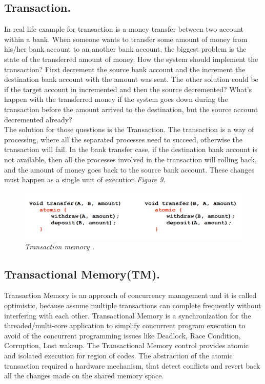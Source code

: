 \documentclass[12pt]{article}
\begin{document}
\subsection{Transaction.}
In real life example for transaction is a money transfer between two account within a bank. When someone wants to transfer some amount of money from his/her bank account to an another bank account, the biggest problem is the state of the transferred amount of money. How the system should implement the transaction?  First decrement the source bank account and the increment the destination bank account with the amount was sent. The other solution could be if the target account in incremented and then the source decremented? What's happen with the transferred money if the system goes down during the transaction before the amount arrived to the destination, but the source account decremented already?\\

The solution for those questions is the Transaction. The transaction is a way of processing, where all the separated processes need to succeed, otherwise the transaction will fail. In the bank transfer case, if the destination bank account is not available, then all the processes involved in the transaction will rolling back, and the amount of money goes back to the source bank account. These changes must happen as a single unit of execution.\textit{\color{gray}Figure 9.}\\

\begin{figure}[h!]
\centering
\includegraphics[scale=0.3]{Pictures/realLife.png}
\caption{\textit{\color{gray}Transaction memory \cite{TMvsLock}.}}
\end{figure}

\subsection{Transactional Memory(TM).}
Transaction Memory is an approach of concurrency management and it is called optimistic, because assume multiple transactions can complete frequently without interfering with each other. Transactional Memory is a synchronization for the threaded/multi-core application to simplify concurrent program execution to avoid of the concurrent programming issues like Deadlock, Race Condition, Corruption, Lost wakeup. The Transactional Memory control provides atomic and isolated execution for region of codes. The abstraction of the atomic transaction required a hardware mechanism, that detect conflicts and revert back all the changes made on the shared memory space.\\
\end{document}
